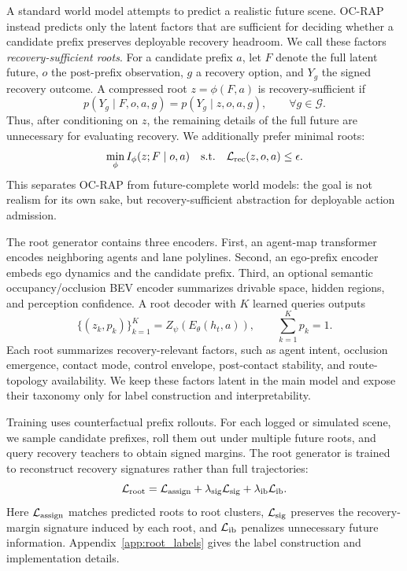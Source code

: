 \documentclass[conference]{IEEEtran}
\begin{document}
A standard world model attempts to predict a realistic future scene.  OC-RAP instead predicts only the latent factors that are sufficient for deciding whether a candidate prefix preserves deployable recovery headroom.  We call these factors \emph{recovery-sufficient roots}.  For a candidate prefix $a$, let $F$ denote the full latent future, $o$ the post-prefix observation, $g$ a recovery option, and $Y_g$ the signed recovery outcome.  A compressed root $z=\phi(F,a)$ is recovery-sufficient if
\begin{equation}
    p(Y_g \mid F,o,a,g)
    =
    p(Y_g \mid z,o,a,g),
    \qquad \forall g \in \mathcal{G}.
    \label{eq:recovery_sufficiency}
\end{equation}
Thus, after conditioning on $z$, the remaining details of the full future are unnecessary for evaluating recovery.  We additionally prefer minimal roots:
\begin{equation}
    \min_{\phi} I_\phi(z;F \mid o,a)
    \quad
    \mathrm{s.t.}
    \quad
    \mathcal{L}_{\rm rec}(z,o,a) \leq \epsilon.
    \label{eq:minimal_root}
\end{equation}
This separates OC-RAP from future-complete world models: the goal is not realism for its own sake, but recovery-sufficient abstraction for deployable action admission.

The root generator contains three encoders.  First, an agent-map transformer encodes neighboring agents and lane polylines.  Second, an ego-prefix encoder embeds ego dynamics and the candidate prefix.  Third, an optional semantic occupancy/occlusion BEV encoder summarizes drivable space, hidden regions, and perception confidence.  A root decoder with $K$ learned queries outputs
\begin{equation}
    \{(z_k,p_k)\}_{k=1}^{K}
    =
    Z_\psi(E_\theta(h_t,a)),
    \qquad
    \sum_{k=1}^{K}p_k=1.
\end{equation}
Each root summarizes recovery-relevant factors, such as agent intent, occlusion emergence, contact mode, control envelope, post-contact stability, and route-topology availability.  We keep these factors latent in the main model and expose their taxonomy only for label construction and interpretability.

Training uses counterfactual prefix rollouts.  For each logged or simulated scene, we sample candidate prefixes, roll them out under multiple future roots, and query recovery teachers to obtain signed margins.  The root generator is trained to reconstruct recovery signatures rather than full trajectories:
\begin{equation}
    \mathcal{L}_{\rm root}
    =
    \mathcal{L}_{\rm assign}
    +
    \lambda_{\rm sig}\mathcal{L}_{\rm sig}
    +
    \lambda_{\rm ib}\mathcal{L}_{\rm ib}.
    \label{eq:root_loss}
\end{equation}
Here $\mathcal{L}_{\rm assign}$ matches predicted roots to root clusters, $\mathcal{L}_{\rm sig}$ preserves the recovery-margin signature induced by each root, and $\mathcal{L}_{\rm ib}$ penalizes unnecessary future information.  Appendix~\ref{app:root_labels} gives the label construction and implementation details.
\end{document}
